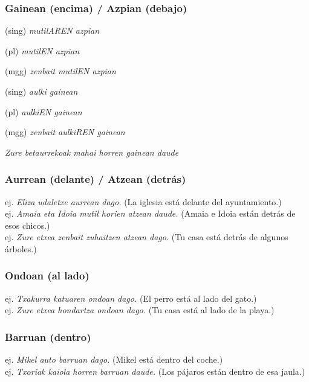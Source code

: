 \documentclass[11pt, a4paper]{article}
\begin{document}
\subsubsection{Gainean (encima) / Azpian (debajo)}
\begin{itemize}
\begin{multicols}{2}
\item (sing) \textit{mutilAREN azpian}
\item (pl) \textit{mutilEN azpian}
\item (mgg) \textit{zenbait mutilEN azpian}\\
\item (sing) \textit{aulki gainean}
\item (pl) \textit{aulkiEN gainean}
\item (mgg) \textit{zenbait aulkiREN gainean}
\item \textit{Zure betaurrekoak mahai horren gainean daude}
\end{multicols}
\end{itemize}

\subsubsection{Aurrean (delante) / Atzean (detr\'as)}
\indent ej. \textit{Eliza udaletxe aurrean dago.} (La iglesia está delante del ayuntamiento.)\\
ej. \textit{Amaia eta Idoia mutil horien atzean daude.} (Amaia e Idoia están detrás de esos chicos.)\\
ej. \textit{Zure etxea zenbait zuhaitzen atzean dago.} (Tu casa está detrás de algunos árboles.)

\subsubsection{Ondoan (al lado)}
\indent ej. \textit{Txakurra katuaren ondoan dago.} (El perro está al lado del gato.)\\
ej. \textit{Zure etxea hondartza ondoan dago.} (Tu casa está al lado de la playa.)

\subsubsection{Barruan (dentro)}
\indent ej. \textit{Mikel auto barruan dago.} (Mikel está dentro del coche.)\\
ej. \textit{Txoriak kaiola horren barruan daude.} (Los pájaros están dentro de esa jaula.)
\end{document}
